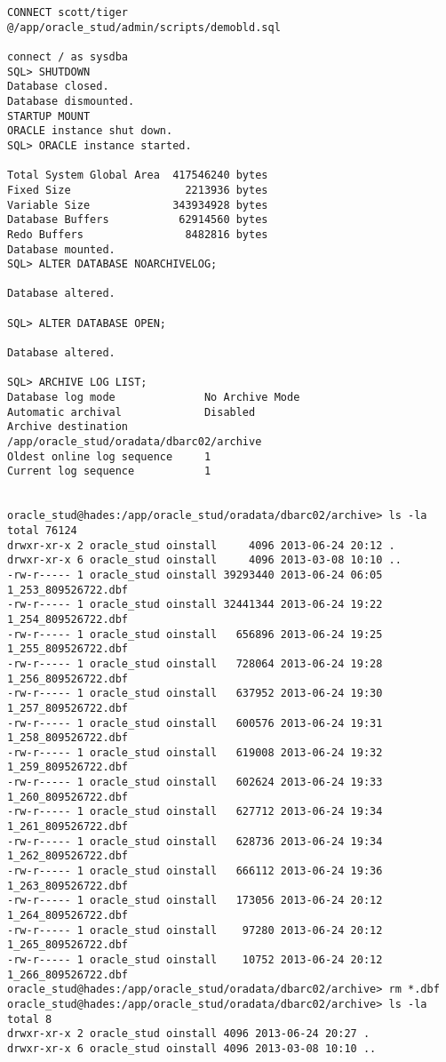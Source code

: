 \documentclass[11pt,a4paper,parskip=half]{scrartcl}
\begin{document}
\begin{lstlisting}
CONNECT scott/tiger
@/app/oracle_stud/admin/scripts/demobld.sql

connect / as sysdba
SQL> SHUTDOWN
Database closed.
Database dismounted.
STARTUP MOUNT
ORACLE instance shut down.
SQL> ORACLE instance started.

Total System Global Area  417546240 bytes
Fixed Size                  2213936 bytes
Variable Size             343934928 bytes
Database Buffers           62914560 bytes
Redo Buffers                8482816 bytes
Database mounted.
SQL> ALTER DATABASE NOARCHIVELOG;

Database altered.

SQL> ALTER DATABASE OPEN;

Database altered.

SQL> ARCHIVE LOG LIST;
Database log mode              No Archive Mode
Automatic archival             Disabled
Archive destination            /app/oracle_stud/oradata/dbarc02/archive
Oldest online log sequence     1
Current log sequence           1


oracle_stud@hades:/app/oracle_stud/oradata/dbarc02/archive> ls -la
total 76124
drwxr-xr-x 2 oracle_stud oinstall     4096 2013-06-24 20:12 .
drwxr-xr-x 6 oracle_stud oinstall     4096 2013-03-08 10:10 ..
-rw-r----- 1 oracle_stud oinstall 39293440 2013-06-24 06:05 1_253_809526722.dbf
-rw-r----- 1 oracle_stud oinstall 32441344 2013-06-24 19:22 1_254_809526722.dbf
-rw-r----- 1 oracle_stud oinstall   656896 2013-06-24 19:25 1_255_809526722.dbf
-rw-r----- 1 oracle_stud oinstall   728064 2013-06-24 19:28 1_256_809526722.dbf
-rw-r----- 1 oracle_stud oinstall   637952 2013-06-24 19:30 1_257_809526722.dbf
-rw-r----- 1 oracle_stud oinstall   600576 2013-06-24 19:31 1_258_809526722.dbf
-rw-r----- 1 oracle_stud oinstall   619008 2013-06-24 19:32 1_259_809526722.dbf
-rw-r----- 1 oracle_stud oinstall   602624 2013-06-24 19:33 1_260_809526722.dbf
-rw-r----- 1 oracle_stud oinstall   627712 2013-06-24 19:34 1_261_809526722.dbf
-rw-r----- 1 oracle_stud oinstall   628736 2013-06-24 19:34 1_262_809526722.dbf
-rw-r----- 1 oracle_stud oinstall   666112 2013-06-24 19:36 1_263_809526722.dbf
-rw-r----- 1 oracle_stud oinstall   173056 2013-06-24 20:12 1_264_809526722.dbf
-rw-r----- 1 oracle_stud oinstall    97280 2013-06-24 20:12 1_265_809526722.dbf
-rw-r----- 1 oracle_stud oinstall    10752 2013-06-24 20:12 1_266_809526722.dbf
oracle_stud@hades:/app/oracle_stud/oradata/dbarc02/archive> rm *.dbf
oracle_stud@hades:/app/oracle_stud/oradata/dbarc02/archive> ls -la
total 8
drwxr-xr-x 2 oracle_stud oinstall 4096 2013-06-24 20:27 .
drwxr-xr-x 6 oracle_stud oinstall 4096 2013-03-08 10:10 ..

\end{lstlisting}
\end{document}
